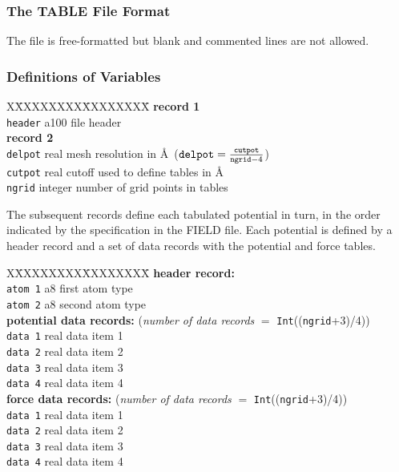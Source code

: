 \subsubsection{The TABLE File Format}

The file is free-formatted but blank and commented lines are not
allowed.

\subsubsection{Definitions of Variables}

\begin{tabbing}
X\=XXXXXXXX\=XXXXXXXX\=\kill
{\bf record 1} \\
\> {\tt header} \> a100    \> file header\\
{\bf record 2} \\
\> {\tt delpot} \> real    \> mesh resolution in \AA~(${\tt delpot} = \frac{\tt cutpot}{{\tt ngrid}-4}$) \\
\> {\tt cutpot} \> real    \> cutoff used to define tables in \AA \\
\> {\tt ngrid}  \> integer \> number of grid points in tables
\end{tabbing}

The subsequent records define each tabulated potential in turn,
{in the order indicated by the specification in the FIELD file}.
Each potential is defined by a header record and a set of data
records with the potential and force tables.

\begin{tabbing}
X\=XXXXXXXX\=XXXXXXXX\=\kill
{\bf header record:}\\
\> {\tt atom 1} \> a8   \> first atom type \\
\> {\tt atom 2} \> a8   \> second atom type \\
{\bf potential data records:} ({\em number of data records} $=$ {\tt Int}(({\tt ngrid}+3)/4)) \\
\> {\tt data 1} \> real \> data item 1 \\
\> {\tt data 2} \> real \> data item 2 \\
\> {\tt data 3} \> real \> data item 3 \\
\> {\tt data 4} \> real \> data item 4 \\
{\bf force data records:} ({\em number of data records} $=$ {\tt Int}(({\tt ngrid}+3)/4)) \\
\> {\tt data 1} \> real \> data item 1 \\
\> {\tt data 2} \> real \> data item 2 \\
\> {\tt data 3} \> real \> data item 3 \\
\> {\tt data 4} \> real \> data item 4
\end{tabbing}

